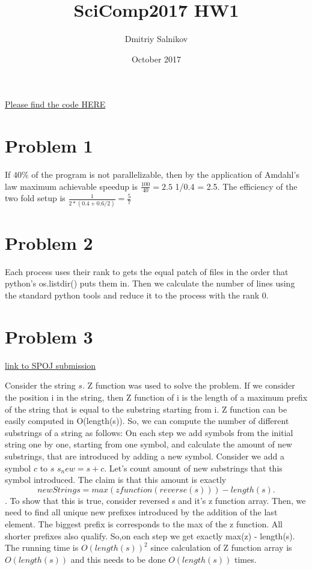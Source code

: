 \documentclass{article}
\title{SciComp2017 HW1}
\author{Dmitriy Salnikov}
\date{October 2017}
\begin{document}
\maketitle

\href{https://github.com/grapefroot/skoltech}{Please find the code HERE}

\section{Problem 1}
If $40\% $ of the program is not parallelizable, then by the application of Amdahl's law maximum achievable speedup is $\frac{100}{40} = 2.5$ 1/0.4 = 2.5. The efficiency of the two fold setup is $\frac{1}{2*(0.4 + 0.6/2)} = \frac{5}{7}$  

\section{Problem 2}
Each process uses their rank to gets the equal patch of files in the order that python's os.listdir() puts them in. Then we calculate the number of lines using the standard python tools and reduce it to the process with the rank 0. 


\section{Problem 3}

\href{http://www.spoj.com/status/DISUBSTR,grapefroot/}{link to SPOJ submission}

Consider the string $s$. Z function was used to solve the problem. If we consider the position i in the string, then Z function of i is the length of a maximum prefix of the string that is equal to the substring starting from i. Z function can be easily computed in O(length(s)). So, we can compute the number of different substrings of a string as follows: On each step we add symbols from the initial string one by one, starting from one symbol, and calculate the amount of new substrings, that are introduced by adding a new symbol. Consider we add a symbol $c$ to $s$ $s_new = s+c$. Let's count amount of new substrings that this symbol introduced. The claim is that this amount is exactly \[newStrings =  max(z function(reverse(s))) - length(s). \]. To show that this is true, consider reversed s and it's z function array. Then, we need to find all unique new prefixes introduced by the addition of the last element. The biggest prefix is corresponds to the max of the z function. All shorter prefixes also qualify. So,on each step we get exactly max(z) - length(s).
The running time is $O(length(s))^2$ since calculation of Z function array is $O(length(s))$ and this needs to be done $O(length(s))$ times.
\end{document}
